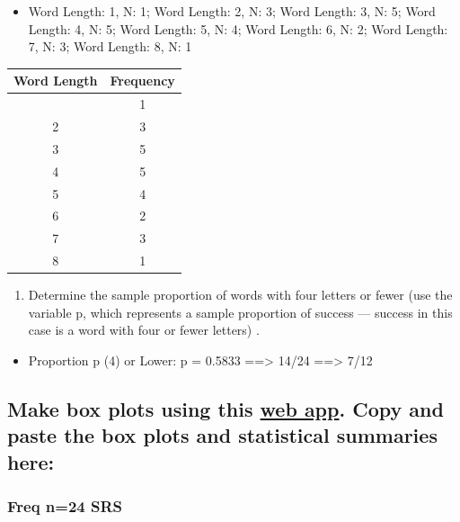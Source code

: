 \documentclass[letterpaper]{article}
\def\tightlist{}
\begin{document}
\begin{itemize}
\tightlist
\item
  Word Length: 1, N: 1;
  Word Length: 2, N: 3;
  Word Length: 3, N: 5;
  Word Length: 4, N: 5;
  Word Length: 5, N: 4;
  Word Length: 6, N: 2;
  Word Length: 7, N: 3;
  Word Length: 8, N: 1
\end{itemize}

\begin{longtable}[]{@{}cc@{}}
\toprule\noalign{}
Word Length & Frequency \\
\midrule\noalign{}
\endhead
\bottomrule\noalign{}
\endlastfoot
1 & 1 \\
2 & 3 \\
3 & 5 \\
4 & 5 \\
5 & 4 \\
6 & 2 \\
7 & 3 \\
8 & 1 \\
\end{longtable}

\begin{enumerate}
\def\labelenumi{\alph{enumi}.}
\setcounter{enumi}{2}
\tightlist
\item
  Determine the sample proportion of words with four letters or fewer (use the variable p, which represents a sample proportion of success --- success in this case is a word with four or fewer letters) .
\end{enumerate}

\begin{itemize}
\tightlist
\item
  Proportion p (4) or Lower: p = 0.5833 ==\textgreater{} 14/24 ==\textgreater{} 7/12
\end{itemize}

\subsection{\texorpdfstring{Make box plots using this \href{https://istats.shinyapps.io/EDA_quantitative/}{web app}. Copy and paste the box plots and statistical summaries here:}{Make box plots using this web app. Copy and paste the box plots and statistical summaries here:}}\label{make-box-plots-using-this-web-app.-copy-and-paste-the-box-plots-and-statistical-summaries-here}

\subsubsection{Freq n=24 SRS}\label{freq-n24-srs}
\end{document}
